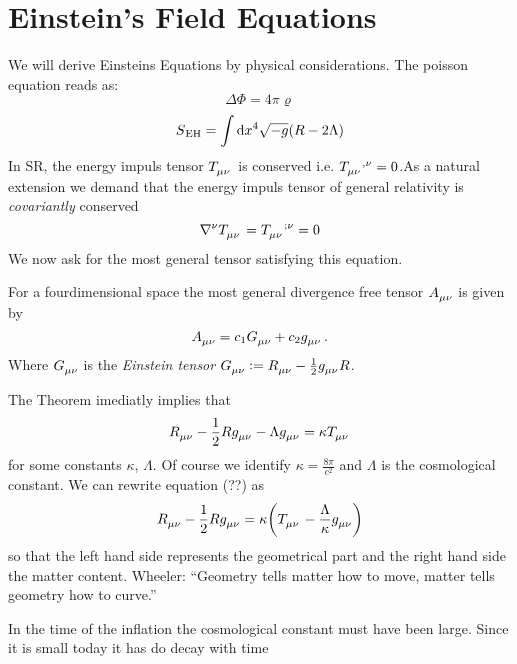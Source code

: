 \chapter{Einstein's Field Equations}
We will derive Einsteins Equations by physical considerations. The poisson
equation reads as:
\begin{equation}
\Delta\Phi=4\pi\varrho
\end{equation}
\begin{equation}
S\textsubscript{EH}=\int\dif x^4 \sqrt{-g}(R-2\Lambda)
\end{equation}
In SR, the energy impuls tensor $\tensor{T}{_\mu_\nu}$ is conserved i.e.
$\tensor{T}{_\mu_\nu^{,\nu}}=0$.As a natural extension we demand that the energy
impuls tensor of general relativity is \emph{covariantly} conserved
\begin{equation}
\tensor{\nabla}{^\nu}\tensor{T}{_\mu_\nu}=\tensor{T}{_\mu_\nu^{;\nu}}=0
\end{equation}
We now ask for the most general tensor satisfying this equation.
\begin{theorem}[Lovelock]
For a fourdimensional space the most general divergence free tensor
$\tensor{A}{_\mu_\nu}$ is given by
\begin{equation}
\tensor{A}{_\mu_\nu}= c_1\tensor{G}{_\mu_\nu}+c_2\tensor{g}{_\mu_\nu}\, .
\end{equation}
Where $\tensor{G}{_\mu_\nu}$ is the \emph{Einstein tensor}
$\tensor{G}{_\mu_\nu}:=\tensor{R}{_\mu_\nu}-\frac{1}{2}\tensor{g}{_\mu_\nu}R$.
\end{theorem}
The Theorem imediatly implies that
\begin{equation}
\tensor{R}{_\mu_\nu}-\frac{1}{2}R\tensor{g}{_\mu_\nu}-\Lambda\tensor{g}{_\mu_\nu}=\kappa\tensor{T}{_\mu_\nu}
\end{equation}
for some constants $\kappa$, $\Lambda$.
Of course we identify $\kappa=\frac{8\pi}{c^2}$ and $\Lambda$ is the
cosmological constant. We can rewrite equation (??) as
\begin{equation}
\tensor{R}{_\mu_\nu}-\frac{1}{2}R\tensor{g}{_\mu_\nu}
=\kappa\left(\tensor{T}{_\mu_\nu}-\frac{\Lambda}{\kappa}\tensor{g}{_\mu_\nu}\right)
\end{equation}
so that the left hand side represents the geometrical part and the right hand
side the matter content.
Wheeler: ``Geometry tells matter how to move, matter tells geometry how to
curve.''
\begin{sidenote}
In the time of the inflation the cosmological constant must have been large.
Since it is small today it has do decay with time
\end{sidenote}
